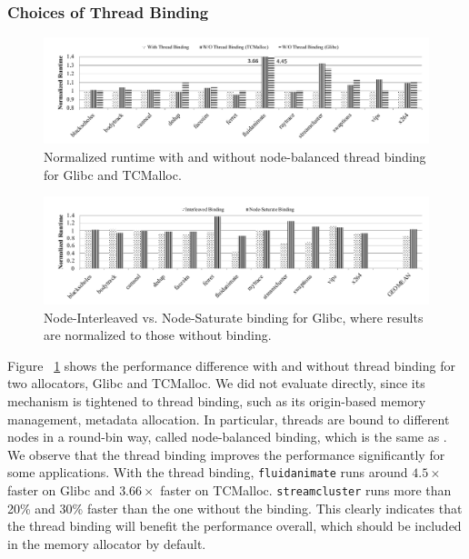 \subsubsection{Choices of Thread Binding}
\label{sec: threadbinding}

\begin{figure}[!h]
    \centering
    \includegraphics[width=6in]{EuroSys2022/figure/WO-pthread-binding3.pdf}
    \caption{Normalized runtime with and without node-balanced thread binding for Glibc and TCMalloc.} 
    \label{binding-pthread-scalibity}
\end{figure}



\begin{figure}[!ht]
    \centering
    \includegraphics[width=5.5in]{figure/binding-policy.pdf}
    \caption{ Node-Interleaved vs. Node-Saturate binding for Glibc, where results are normalized to those without binding.}
    \label{fig:binding-policy}  
\end{figure}


Figure ~\ref{binding-pthread-scalibity} shows the performance difference with and without thread binding for two allocators, Glibc and TCMalloc. We did not evaluate \NM{} directly, since its mechanism is tightened to thread binding, such as its origin-based memory management, metadata allocation. In particular, threads are bound to different nodes in a round-bin way, called node-balanced binding, which is the same as \NM{}. We observe that the thread binding improves the performance significantly for some applications. With the thread binding, \texttt{fluidanimate} runs around $4.5\times$ faster on Glibc and $3.66\times$ faster on TCMalloc. \texttt{streamcluster} runs more than 20\% and 30\% faster than the one without the binding. This clearly indicates that the thread binding will benefit the performance overall, which should be included in the memory allocator by default. 

